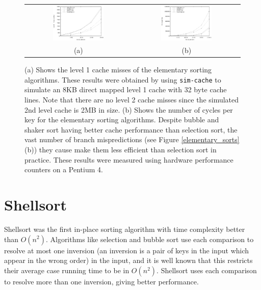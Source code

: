 \documentclass[acmtocl]{acmtrans2m}
\begin{document}
\begin{figure}
\centering
\begin{tabular}{cc}
\includegraphics[width=0.5\textwidth]{plots/elementary_cache1_misses.eps} & \includegraphics[width=0.5\textwidth]{plots/elementary_cycles.eps}\\
(a) & (b) \\
\end{tabular}
\caption{(a) Shows the level 1 cache misses of the elementary sorting algorithms. 
These results were obtained by using \texttt{sim-cache} to simulate an 8KB direct mapped 
level 1 cache with 32 byte cache lines. Note that there are no level 2 cache misses since the simulated 2nd
level cache is 2MB in size.
(b) Shows the number of cycles per key for the elementary sorting algorithms. 
Despite bubble and shaker sort having better cache performance than selection sort, the vast number of branch mispredictions 
(see Figure \ref{elementary_sorts}(b)) they cause make them less efficient than selection sort in practice.
These results were measured using hardware performance counters on a Pentium 4.}
\label{shaker_plots}
\end{figure}

\section{Shellsort}

Shellsort \cite{Shell59} was the first in-place sorting algorithm
with time complexity better than $O(n^2)$.
Algorithms like selection and bubble sort use each comparison
to resolve at most one inversion (an inversion is 
a pair of keys in the input which appear in the wrong order) in the input, and
it is well known that this restricts their average case running
time to be in $O(n^2)$. Shellsort uses each comparison to
resolve more than one inversion, giving better performance.
\end{document}
